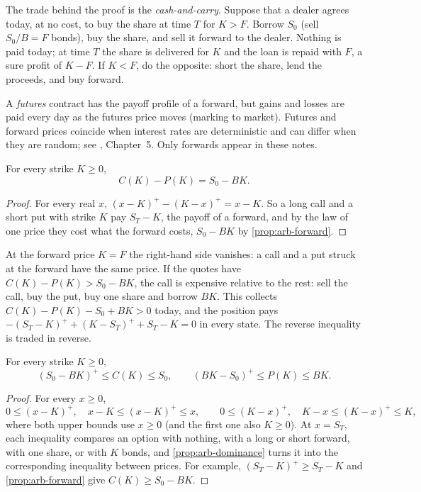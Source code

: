 The trade behind the proof is the \emph{cash-and-carry}. Suppose that a dealer agrees today,
at no cost, to buy the share at time $T$ for $K>F$. Borrow $S_0$ (sell $S_0/B=F$ bonds), buy
the share, and sell it forward to the dealer. Nothing is paid today; at time $T$ the share
is delivered for $K$ and the loan is repaid with $F$, a sure profit of $K-F$. If $K<F$, do
the opposite: short the share, lend the proceeds, and buy forward.

\begin{remark}
A \emph{futures} contract has the payoff profile of a forward, but gains and losses are paid
every day as the futures price moves (marking to market). Futures and forward prices
coincide when interest rates are deterministic and can differ when they are random; see
\textcite{hull}, Chapter~5. Only forwards appear in these notes.
\end{remark}

\begin{proposition}\label{prop:arb-parity}
For every strike $K\ge0$,
\[
  C(K)-P(K)=S_0-BK .
\]
\end{proposition}

\begin{proof}
For every real $x$, $(x-K)^+-(K-x)^+=x-K$. So a long call and a short put with strike $K$
pay $S_T-K$, the payoff of a forward, and by the law of one price they cost what the forward
costs, $S_0-BK$ by \cref{prop:arb-forward}.
\end{proof}

At the forward price $K=F$ the right-hand side vanishes: a call and a put struck at the
forward have the same price. If the quotes have $C(K)-P(K)>S_0-BK$, the call is expensive
relative to the rest: sell the call, buy the put, buy one share and borrow $BK$. This
collects $C(K)-P(K)-S_0+BK>0$ today, and the position pays
$-(S_T-K)^++(K-S_T)^++S_T-K=0$ in every state. The reverse inequality is traded in reverse.

\begin{proposition}[Bounds]\label{prop:arb-bounds}
For every strike $K\ge0$,
\[
  (S_0-BK)^+\le C(K)\le S_0,\qquad (BK-S_0)^+\le P(K)\le BK .
\]
\end{proposition}

\begin{proof}
For every $x\ge0$,
\[
  0\le(x-K)^+,\quad x-K\le(x-K)^+\le x,\qquad
  0\le(K-x)^+,\quad K-x\le(K-x)^+\le K,
\]
where both upper bounds use $x\ge0$ (and the first one also $K\ge0$). At $x=S_T$, each inequality compares an option with
nothing, with a long or short forward, with one share, or with $K$ bonds, and
\cref{prop:arb-dominance} turns it into the corresponding inequality between prices. For
example, $(S_T-K)^+\ge S_T-K$ and \cref{prop:arb-forward} give $C(K)\ge S_0-BK$.
\end{proof}

